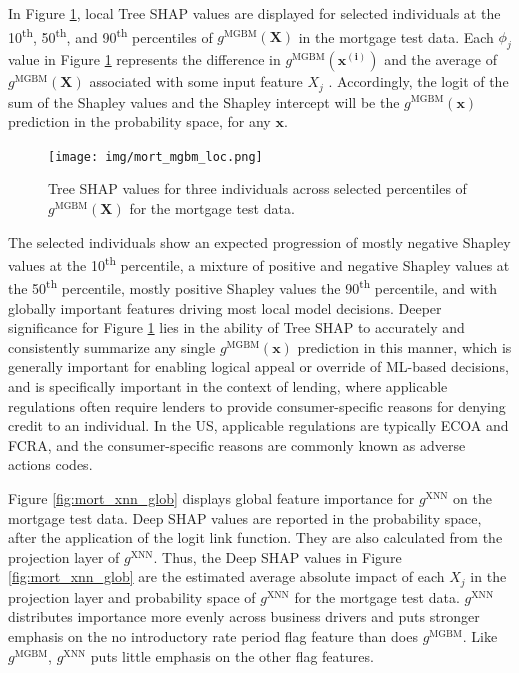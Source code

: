 \documentclass[information,article,submit,moreauthors,pdftex]{definitions/mdpi}
\begin{document}
In Figure \ref{fig:mort_mgbm_loc}, local Tree SHAP values are displayed for selected individuals at the 10\textsuperscript{th}, 50\textsuperscript{th}, and 90\textsuperscript{th} percentiles of $g^{\text{MGBM}}(\mathbf{X})$ in the mortgage test data. Each $\phi_j$ value in Figure \ref{fig:mort_mgbm_loc} represents the difference in $g^\text{MGBM}(\mathbf{x^{(i)}})$ and the average of $g^\text{MGBM}(\mathbf{X})$ associated with some input feature $X_j$ \cite{molnar}. Accordingly, the logit of the sum of the Shapley values and the Shapley intercept will be the $g^\text{MGBM}(\mathbf{x})$ prediction in the probability space, for any $\mathbf{x}$. 

\begin{figure}[htb]
\centering
\texttt{[image: img/mort\_mgbm\_loc.png]}
\caption{Tree SHAP values for three individuals across selected percentiles of $g^\text{MGBM}(\mathbf{X})$ for the mortgage test data.}
\label{fig:mort_mgbm_loc}
\end{figure}   

\noindent The selected individuals show an expected progression of mostly negative Shapley values at the 10\textsuperscript{th} percentile, a mixture of positive and negative Shapley values at the 50\textsuperscript{th} percentile, mostly positive Shapley values the 90\textsuperscript{th} percentile, and with globally important features driving most local model decisions. Deeper significance for Figure \ref{fig:mort_mgbm_loc} lies in the ability of Tree SHAP to accurately and consistently summarize any single $g^\text{MGBM}(\mathbf{x})$ prediction in this manner, which is generally important for enabling logical appeal or override of ML-based decisions, and is specifically important in the context of lending, where applicable regulations often require lenders to provide consumer-specific reasons for denying credit to an individual. In the US, applicable regulations are typically ECOA and FCRA, and the consumer-specific reasons are commonly known as adverse actions codes.

Figure \ref{fig:mort_xnn_glob} displays global feature importance for $g^\text{XNN}$ on the mortgage test data. Deep SHAP values are reported in the probability space, after the application of the logit link function. They are also calculated from the projection layer of $g^\text{XNN}$. Thus, the Deep SHAP values in Figure \ref{fig:mort_xnn_glob} are the estimated average absolute impact of each $X_j$ in the projection layer and probability space of $g^\text{XNN}$ for the mortgage test data. $g^\text{XNN}$ distributes importance more evenly across business drivers and puts stronger emphasis on the no introductory rate period flag feature than does $g^\text{MGBM}$. Like $g^\text{MGBM}$, $g^\text{XNN}$ puts little emphasis on the other flag features.  
\end{document}
